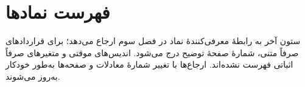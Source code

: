 \cleardoublepage
\chapter*{فهرست نمادها}
{}
ستون آخر به رابطهٔ معرفی‌کنندهٔ نماد در فصل سوم ارجاع می‌دهد؛ برای قراردادهای صرفاً متنی، شمارهٔ صفحهٔ توضیح درج می‌شود.
اندیس‌های موقتی و متغیرهای صرفاً اثباتی فهرست نشده‌اند.
ارجاع‌ها با تغییر شمارهٔ معادلات و صفحه‌ها به‌طور خودکار به‌روز می‌شوند.

\begingroup
\small
\setlength{\tabcolsep}{4pt}
\renewcommand{\arraystretch}{1.5}
\newcommand{\notationrow}[3]{\(\displaystyle #1\) & #2 & \eqref{#3}\\ \hline}
\newcommand{\notationrowalg}[3]{\(\displaystyle #1\) & #2 & الگوریتم~\ref{#3}\\ \hline}
\newcommand{\notationrowsec}[3]{\(\displaystyle #1\) & #2 & بخش~\ref{#3}\\ \hline}
\newcommand{\notationrowpage}[3]{\(\displaystyle #1\) & #2 & ص.~\pageref{#3}\\ \hline}
\newcommand{\notationgroup}[1]{\multicolumn{3}{|r|}{\textbf{#1}}\\ \hline}
